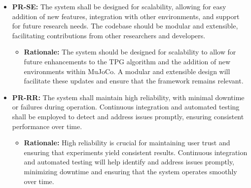 \documentclass[12pt]{article}
\begin{document}
\begin{itemize}
\item \textbf{PR-SE:} The system shall be designed for scalability, allowing for easy addition of new features, integration with other environments, and support for future research needs. The codebase should be modular and extensible, facilitating contributions from other researchers and developers.
  \begin{itemize}
    \item \textbf{Rationale:} The system should be designed for scalability to allow for future enhancements to the TPG algorithm and the addition of new environments within MuJoCo. A modular and extensible design will facilitate these updates and ensure that the framework remains relevant.
  \end{itemize}

\item \textbf{PR-RR:} The system shall maintain high reliability, with minimal downtime or failures during operation. Continuous integration and automated testing shall be employed to detect and address issues promptly, ensuring consistent performance over time.
  \begin{itemize}
    \item \textbf{Rationale:} High reliability is crucial for maintaining user trust and ensuring that experiments yield consistent results. Continuous integration and automated testing will help identify and address issues promptly, minimizing downtime and ensuring that the system operates smoothly over time.
  \end{itemize}
\end{itemize}
\end{document}
